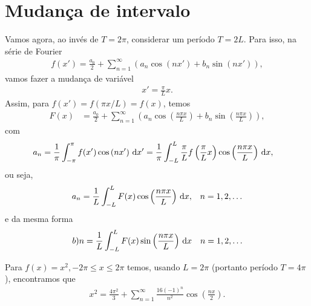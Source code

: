 \section{Mudan\c{c}a de intervalo}
Vamos agora, ao inv\'{e}s de $T = 2 \pi$, considerar um per\'{i}odo $T = 2 L$. Para isso, na s\'{e}rie de Fourier
\begin{align*}
    f(x') = \frac{a_0}{2} + \sum_{n = 1}^\infty \left( a_n \cos\left( n x' \right) + b_n \sin\left( n x' \right) \right),
\end{align*}
vamos fazer a mudan\c{c}a de vari\'{a}vel
\begin{align*}
    x' = \frac{\pi}{L} x.
\end{align*}
Assim, para $f(x') = f(\pi x / L) = f(x)$, temos
\begin{align*}
    F(x) &= \frac{a_0}{2} + \sum_{n = 1}^\infty \left( a_n \cos\left( \frac{n \pi x}{L} \right) + b_n \sin\left( \frac{n \pi x}{L} \right) \right),
\end{align*}
com
\begin{align*}
    a_n &= \frac{1}{\pi} \int_{-\pi}^\pi f(x') \cos\left( n x' \right) \, \mathrm{d}x' = \frac{1}{\pi} \int_{-L}^L \frac{\pi}{L} f\left( \frac{\pi}{L} x \right) \cos\left( \frac{n \pi x}{L} \right) \, \mathrm{d}x,
\end{align*}
ou seja,
\begin{align*}
    a_n &= \frac{1}{L} \int_{-L}^L F(x) \cos\left( \frac{n \pi x}{L} \right) \, \mathrm{d}x, & n = 1, 2, \ldots
\end{align*}
e da mesma forma
\begin{align*}
    b)n &= \frac{1}{L} \int_{-L}^L F(x) \sin\left( \frac{n \pi x}{L} \right) \, \mathrm{d}x & n = 1, 2, \ldots
\end{align*}

\begin{exem}
    Para $f(x) = x^2, - 2 \pi \leq x \leq 2 \pi$ temos, usando $L = 2 \pi$ (portanto per\'{i}odo $T = 4\pi$), encontramos que
    \begin{align*}
        x^2 = \frac{4 \pi^2}{3} + \sum_{n = 1}^\infty \frac{16 (-1)^n}{n^2} \cos\left( \frac{n x}{2} \right).
    \end{align*}
\end{exem}

